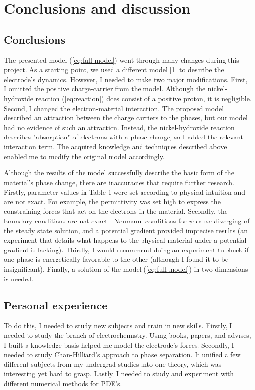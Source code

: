 \documentclass[12pt]{article}
\begin{document}
\pagebreak
\section{Conclusions and discussion}

\subsection{Conclusions}
The presented model (\ref{eq:full-model}) went through many changes during this project. As a starting point, we used a different model \hyperref[c:1]{[1]}  to describe the electrode's dynamics. However, I needed to make two major modifications. First, I omitted the positive charge-carrier from the model. Although the nickel-hydroxide reaction (\ref{eq:reaction}) does consist of a positive proton, it is negligible. Second, I changed the electron-material interaction. The proposed model described an attraction between the charge carriers to the phases, but our model had no evidence of such an attraction. Instead, the nickel-hydroxide reaction describes "absorption" of electrons with a phase change, so I added the relevant \hyperref[sec:electron-material]{interaction term}. The acquired knowledge and techniques described above enabled me to modify the original model accordingly.

Although the results of the model successfully describe the basic form of the material's phase change, there are inaccuracies that require further research. Firstly, parameter values in \hyperref[table:1]{Table 1} were set according to physical intuition and are not exact. For example, the permittivity was set high to express the constraining forces that act on the electrons in the material. Secondly, the boundary conditions are not exact - Neumann conditions for $\psi$ cause diverging of the steady state solution, and a potential gradient provided imprecise results (an experiment that details what happens to the physical material under a potential gradient is lacking). Thirdly, I would recommend doing an experiment to check if one phase is energetically favorable to the other (although I found it to be insignificant). Finally, a solution of the model (\ref{eq:full-model}) in two dimensions is needed.


\subsection{Personal experience}
To do this, I needed to study new subjects and train in new skills. Firstly, I needed to study the branch of electrochemistry. Using books, papers, and advises, I built a knowledge basis helped me model the electrode's forces. Secondly, I needed to study Chan-Hilliard's approach to phase separation. It unified a few different subjects from my undergrad studies into one theory, which was interesting yet hard to grasp. Lastly, I needed to study and experiment with different numerical methods for PDE's.
\end{document}

